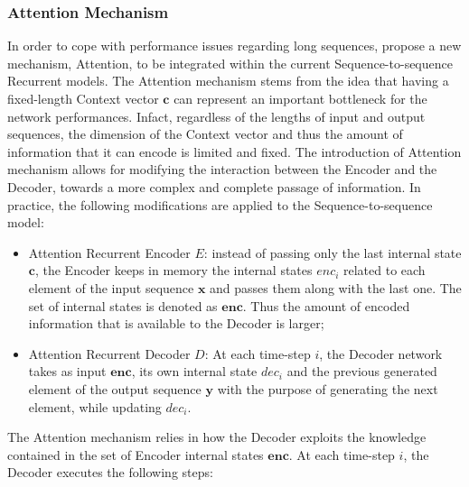                         
            \subsubsection{Attention Mechanism}
            \label{subsub:attention_mechanism}
                In order to cope with performance issues regarding long sequences,  propose a new mechanism, Attention, to be integrated within the current Sequence-to-sequence Recurrent models. \newline
                The Attention mechanism stems from the idea that having a fixed-length Context vector $\mathbf{c}$ can represent an important bottleneck for the network performances. Infact, regardless of the lengths of input and output sequences, the dimension of the Context vector and thus the amount of information that it can encode is limited and fixed. The introduction of Attention mechanism allows for modifying the interaction between the Encoder and the Decoder, towards a more complex and complete passage of information. In practice, the following modifications are applied to the Sequence-to-sequence model:
                
                \begin{itemize}[topsep=0.5em, partopsep=0.5em]
                    \setlength\itemsep{0em}
                    \item Attention Recurrent Encoder $E$: instead of passing only the last internal state $\mathbf{c}$, the Encoder keeps in memory the internal states $enc_i$ related to each element of the input sequence $\mathbf{x}$ and passes them along with the last one. The set of internal states is denoted as $\mathbf{enc}$. Thus the amount of encoded information that is available to the Decoder is larger;
                    \item Attention Recurrent Decoder $D$: At each time-step $i$, the Decoder network takes as input $\mathbf{enc}$, its own internal state $dec_i$ and the previous generated element of the output sequence $\mathbf{y}$ with the purpose of generating the next element, while updating $dec_i$.
                \end{itemize}
                
                The Attention mechanism relies in how the Decoder exploits the knowledge contained in the set of Encoder internal states $\mathbf{enc}$. At each time-step $i$, the Decoder executes the following steps:
                
